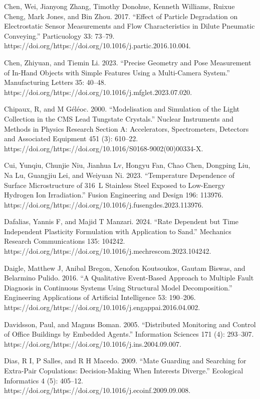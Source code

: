 \documentclass[utf8]{gradu3}
\begin{document}
Chen, Wei, Jianyong Zhang, Timothy Donohue, Kenneth Williams, Ruixue Cheng, Mark Jones, and Bin Zhou. 2017. “Effect of Particle Degradation on Electrostatic Sensor Measurements and Flow Characteristics in Dilute Pneumatic Conveying.” Particuology 33: 73–79. https://doi.org/https://doi.org/10.1016/j.partic.2016.10.004.

Chen, Zhiyuan, and Tiemin Li. 2023. “Precise Geometry and Pose Measurement of In-Hand Objects with Simple Features Using a Multi-Camera System.” Manufacturing Letters 35: 40–48. https://doi.org/https://doi.org/10.1016/j.mfglet.2023.07.020.

Chipaux, R, and M Géléoc. 2000. “Modelisation and Simulation of the Light Collection in the CMS Lead Tungstate Crystals.” Nuclear Instruments and Methods in Physics Research Section A: Accelerators, Spectrometers, Detectors and Associated Equipment 451 (3): 610–22. https://doi.org/https://doi.org/10.1016/S0168-9002(00)00334-X.

Cui, Yunqiu, Chunjie Niu, Jianhua Lv, Hongyu Fan, Chao Chen, Dongping Liu, Na Lu, Guangjiu Lei, and Weiyuan Ni. 2023. “Temperature Dependence of Surface Microstructure of 316 L Stainless Steel Exposed to Low-Energy Hydrogen Ion Irradiation.” Fusion Engineering and Design 196: 113976. https://doi.org/https://doi.org/10.1016/j.fusengdes.2023.113976.

Dafalias, Yannis F, and Majid T Manzari. 2024. “Rate Dependent but Time Independent Plasticity Formulation with Application to Sand.” Mechanics Research Communications 135: 104242. https://doi.org/https://doi.org/10.1016/j.mechrescom.2023.104242.

Daigle, Matthew J, Anibal Bregon, Xenofon Koutsoukos, Gautam Biswas, and Belarmino Pulido. 2016. “A Qualitative Event-Based Approach to Multiple Fault Diagnosis in Continuous Systems Using Structural Model Decomposition.” Engineering Applications of Artificial Intelligence 53: 190–206. https://doi.org/https://doi.org/10.1016/j.engappai.2016.04.002.

Davidsson, Paul, and Magnus Boman. 2005. “Distributed Monitoring and Control of Office Buildings by Embedded Agents.” Information Sciences 171 (4): 293–307. https://doi.org/https://doi.org/10.1016/j.ins.2004.09.007.

Dias, R I, P Salles, and R H Macedo. 2009. “Mate Guarding and Searching for Extra-Pair Copulations: Decision-Making When Interests Diverge.” Ecological Informatics 4 (5): 405–12. https://doi.org/https://doi.org/10.1016/j.ecoinf.2009.09.008.
\end{document}
